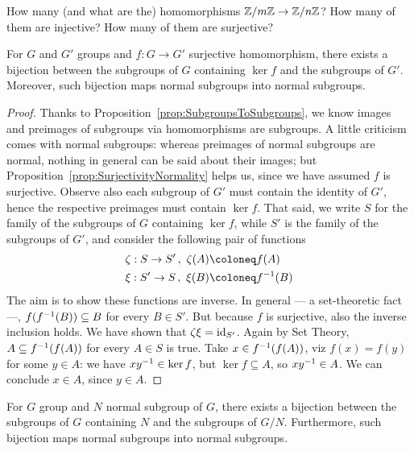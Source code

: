 \begin{exercise}
How many (and what are the) homomorphisms \(\mathbb Z/m\mathbb Z \to \mathbb Z/n\mathbb Z\)? How many of them are injective? How many of them are surjective?
\end{exercise}

\begin{proposition}
For \(G\) and \(G'\) groups and \(f : G \to G'\) surjective homomorphism, there exists a bijection between the subgroups of \(G\) containing \(\ker f\) and the subgroups of \(G'\). Moreover, such bijection maps normal subgroups into normal subgroups.
\end{proposition}

\begin{proof}
Thanks to Proposition~\ref{prop:SubgroupsToSubgroups}, we know images and preimages of subgroups via homomorphisms are subgroups. A little criticism comes with normal subgroups: whereas preimages of normal subgroups are normal, nothing in general can be said about their images; but Proposition~\ref{prop:SurjectivityNormality} helps us, since we have assumed \(f\) is surjective. Observe also each subgroup of \(G'\) must contain the identity of \(G'\), hence the respective preimages must contain \(\ker f\).\newline
That said, we write \(S\) for the family of the subgroups of \(G\) containing \(\ker f\), while \(S'\) is the family of the subgroups of \(G'\), and consider the following pair of functions
\begin{align*}
& \zeta : S \to S'\,,\ \zeta(A) \coloneq f(A) \\
& \xi : S' \to S\,, \ \xi(B) \coloneq \inv f(B)
\end{align*}
The aim is to show these functions are inverse.\newline
In general --- a set-theoretic fact ---, \(f(f^{-1}(B)) \subseteq B\) for every \(B \in S'\). But because \(f\) is surjective, also the inverse inclusion holds. We have shown that \(\zeta \xi = \text{id}_{S'}\).\newline
Again by Set Theory, \(A \subseteq f^{-1}(f(A))\) for every \(A \in S\) is true. Take \(x \in f^{-1}(f(A))\), viz \(f(x) = f(y)\) for some \(y \in A\): we have \(xy^{-1} \in \ker f\), but \(\ker f \subseteq A\), so \(x y^{-1} \in A\). We can conclude \(x \in A\), since \(y \in A\). 
\end{proof}

\begin{corollary}
For \(G\) group and \(N\) normal subgroup of \(G\), there exists a bijection between the subgroups of \(G\) containing \(N\) and the subgroups of \(G/N\). Furthermore, such bijection maps normal subgroups into normal subgroups.
\end{corollary}

